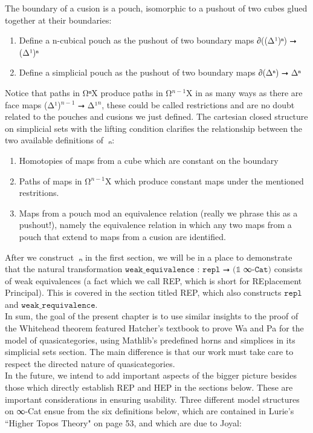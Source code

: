 \documentclass{book}
\theoremstyle{definition}
\begin{document}
The boundary of a cusion is a pouch, isomorphic to a pushout of two cubes glued together at their boundaries:

\begin{enumerate}
\item Define a n-cubical pouch as the pushout of two boundary maps ∂((Δ¹)ⁿ) ⭢ (Δ¹)ⁿ
\item Define a simplicial pouch as the pushout of two boundary maps ∂(Δⁿ) ⭢ Δⁿ
\end{enumerate}

Notice that paths in Ω⃗ⁿX produce paths in Ω⃗${}^{n-1}$X in as many ways as there are face maps (Δ¹)${}^{n-1}$ ⭢ Δ¹${}^{n}$, these could be called restrictions and are no doubt related to the pouches and cusions we just defined. The cartesian closed structure on simplicial sets with the lifting condition clarifies the relationship between the two available definitions of π⃗ₙ:

\begin{enumerate}
\item Homotopies of maps from a cube which are constant on the boundary
\item Paths of maps in Ω⃗${}^{n-1}$X which produce constant maps under the mentioned restritions.
\item Maps from a pouch mod an equivalence relation (really we phrase this as a pushout!), namely the equivalence relation in which any two maps from a pouch that extend to maps from a cusion are identified.
\end{enumerate}

After we construct π⃗ₙ in the first section, we will be in a place to demonstrate that the natural transformation $\texttt{weak\_equivalence : repl ⭢ (𝟙 }$∞$\texttt{-Cat)}$ consists of weak equivalences (a fact which we call REP, which is short for REplacement Principal). This is covered in the section titled REP, which also constructs $\texttt{repl}$ and $\texttt{weak\_requivalence}$.\\

In sum, the goal of the present chapter is to use similar insights to the proof of the Whitehead theorem featured Hatcher's textbook to prove Wa and Pa for the model of quasicategories, using Mathlib's predefined horns and simplices in its simplicial sets section. The main difference is that our work must take care to respect the directed nature of quasicategories.\\

\iffalse
In the future, we intend to add important aspects of the bigger picture besides those which directly establish REP and HEP in the sections below. These are important considerations in ensuring usability. Three different model structures on ∞-Cat ensue from the six definitions below, which are contained in Lurie's ``Higher Topos Theory" on page 53, and which are due to Joyal:
\end{document}
